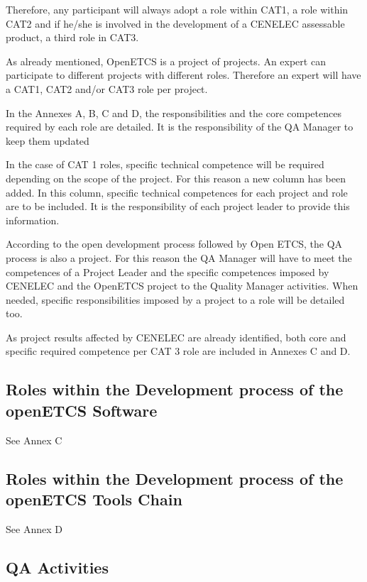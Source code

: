 \documentclass{template/openetcs_article}
\begin{document}
Therefore, any participant will always adopt a role within CAT1, a role within CAT2 and if he/she is involved in the development of a CENELEC assessable product, a third role in CAT3.

As already mentioned, OpenETCS is a project of projects. An expert can participate to different projects with different roles. Therefore an expert will have a CAT1, CAT2 and/or CAT3 role per project.

In the Annexes A, B, C and D, the responsibilities and the core competences required by each role are detailed. It is the responsibility of the QA Manager to keep them updated

In the case of CAT 1 roles, specific technical competence will be required depending on the scope of the project. For this reason a new column has been added. In this column, specific technical competences for each project and role are to be included. It is the responsibility of each project leader to provide this information.

According to the open development process followed by Open ETCS, the QA process is also a project. For this reason the QA Manager will have to meet the competences of a Project Leader and the specific competences imposed by CENELEC and the OpenETCS project to the Quality Manager activities. When needed, specific responsibilities imposed by a project to a role will be detailed too.

As project results affected by CENELEC are already identified, both core and specific required competence per CAT 3 role are included in Annexes C and D.

\subsection{Roles within the Development process of the openETCS Software}

See Annex C
\subsection{Roles within the Development process of the openETCS Tools Chain}

See Annex D
\subsection{QA Activities}
\end{document}
